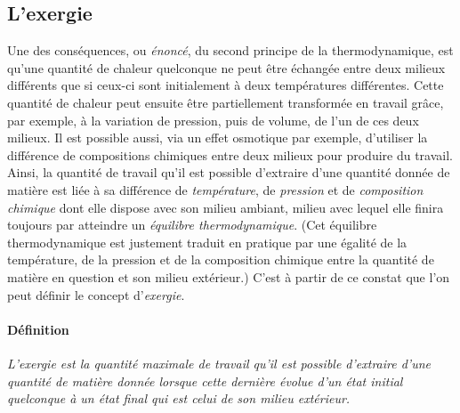 \documentclass[a4paper,11pt]{scrartcl}
\begin{document}
\subsection{L'exergie} Une des conséquences, ou \emph{énoncé}, du second
principe de la thermodynamique, est qu'une quantité de chaleur quelconque ne
peut être échangée entre deux milieux différents que si ceux-ci sont initialement à
deux températures différentes. Cette quantité de chaleur peut ensuite être
partiellement transformée en travail grâce, par exemple, à la variation de
pression, puis de volume, de l'un de ces deux milieux. Il est possible aussi,
via un effet osmotique par exemple, d'utiliser la différence de compositions
chimiques entre deux milieux pour produire du travail. Ainsi, la quantité de
travail qu'il est possible d'extraire d'une quantité donnée de matière est liée
à sa différence de \emph{température}, de \emph{pression} et de
\emph{composition chimique} dont elle dispose avec son milieu ambiant, milieu
avec lequel elle finira toujours par atteindre un \emph{équilibre
thermodynamique}.  (Cet équilibre thermodynamique est justement traduit en
pratique par une égalité de la température, de la pression et de la composition
chimique entre la quantité de matière en question et son milieu extérieur.)
C'est à partir de ce constat que l'on peut définir le concept d'\emph{exergie}.

\paragraph{Définition} \textsl{L'exergie est la quantité maximale de travail
qu'il est possible d'extraire d'une quantité de matière donnée lorsque cette
dernière évolue d'un état initial quelconque à un état final qui est celui de
son milieu extérieur.}

\bigskip
\end{document}
